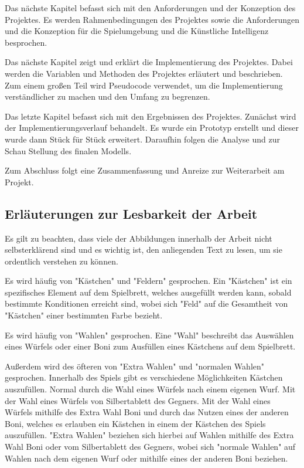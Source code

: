 Das nächste Kapitel befasst sich mit den Anforderungen und der Konzeption des Projektes. Es werden Rahmenbedingungen des Projektes sowie die Anforderungen und die Konzeption für die Spielumgebung und die Künstliche Intelligenz besprochen.

Das nächste Kapitel zeigt und erklärt die Implementierung des Projektes. Dabei werden die Variablen und Methoden des Projektes erläutert und beschrieben. Zum einem großen Teil wird Pseudocode verwendet, um die Implementierung verständlicher zu machen und den Umfang zu begrenzen.

Das letzte Kapitel befasst sich mit den Ergebnissen des Projektes. Zunächst wird der Implementierungsverlauf behandelt. Es wurde ein Prototyp erstellt und dieser wurde dann Stück für Stück erweitert. Daraufhin folgen die Analyse und zur Schau Stellung des finalen Modells.

Zum Abschluss folgt eine Zusammenfassung und Anreize zur Weiterarbeit am Projekt.
\subsection{Erläuterungen zur Lesbarkeit der Arbeit}
Es gilt zu beachten, dass viele der Abbildungen innerhalb der Arbeit nicht selbsterklärend sind und es wichtig ist, den anliegenden Text zu lesen, um sie ordentlich verstehen zu können. 

Es wird häufig von "Kästchen" und "Feldern" gesprochen. Ein "Kästchen" ist ein spezifisches Element auf dem Spielbrett, welches ausgefüllt werden kann, sobald bestimmte Konditionen erreicht sind, wobei sich "Feld" auf die Gesamtheit von "Kästchen" einer bestimmten Farbe bezieht.

Es wird häufig von "Wahlen" gesprochen. Eine "Wahl" beschreibt das Auswählen eines Würfels oder einer Boni zum Ausfüllen eines Kästchens auf dem Spielbrett.

Außerdem wird des öfteren von "Extra Wahlen" und "normalen Wahlen" gesprochen. Innerhalb des Spiels gibt es verschiedene Möglichkeiten Kästchen auszufüllen. Normal durch die Wahl eines Würfels nach einem eigenen Wurf. Mit der Wahl eines Würfels von Silbertablett des Gegners. Mit der Wahl eines Würfels mithilfe des Extra Wahl Boni und durch das Nutzen eines der anderen Boni, welches es erlauben ein Kästchen in einem der Kästchen des Spiels auszufüllen. "Extra Wahlen" beziehen sich hierbei auf Wahlen mithilfe des Extra Wahl Boni oder vom Silbertablett des Gegners, wobei sich "normale Wahlen" auf Wahlen nach dem eigenen Wurf oder mithilfe eines der anderen Boni beziehen.

